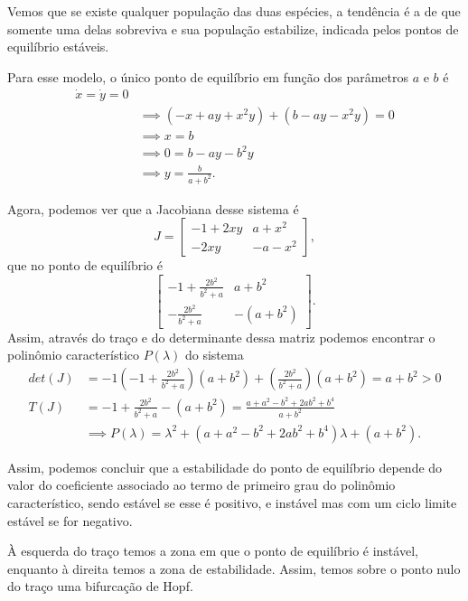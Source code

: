 \documentclass[a4paper]{report}
\begin{document}

Vemos que se existe qualquer população das duas espécies, a tendência é a de que somente uma delas sobreviva e sua população estabilize, indicada pelos pontos de equilíbrio estáveis.



Para esse modelo, o único ponto de equilíbrio em função dos parâmetros $a$ e $b$ é
\begin{align*}
    \dot{x} = \dot{y} = 0 \\
    &\implies\left( -x + ay +x^2y \right) + \left( b-ay-x^2y \right) =0 \\
    &\implies x = b \\
    &\implies 0=b-ay-b^2y \\
    &\implies y = \frac{b}{a+b^2}
.\end{align*}

Agora, podemos ver que a Jacobiana desse sistema é \[
J = \begin{bmatrix} 
    -1 +2xy & a+x^2 \\
    -2xy & -a -x^2
\end{bmatrix} 
,\] que no ponto de equilíbrio é \[
\begin{bmatrix} 
    -1 +\frac{2b^2}{b^2+ a} & a+b^2 \\
    -\frac{2b^2}{b^2 + a} & -(a +b^2)
\end{bmatrix} 
.\] Assim, através do traço e do determinante dessa matriz podemos encontrar o polinômio característico $P\left( \lambda \right)$ do sistema
\begin{align*}
    det(J) &= -1 \left( -1 + \frac{2b^2}{b^2+a} \right) \left(a+b^2  \right) + \left(    \frac{2b^2}{b^2+a}\right) \left( a+b^2 \right) = a+b^2 > 0\\
    T(J) &= -1 + \frac{2b^2}{b^2+a} -\left( a+b^2 \right) = \frac{a + a^2 - b^2 +2ab^2 + b^{4}}{a+b^2}\\
	 &\implies P\left( \lambda \right) = \lambda^2 + \left( a + a^2 - b^2 +2ab^2 + b^{4} \right) \lambda + \left( a+b^2 \right)
.\end{align*}

Assim, podemos concluir que a estabilidade do ponto de equilíbrio depende do valor do coeficiente associado ao termo de primeiro grau do polinômio característico, sendo estável se esse é positivo, e instável mas com um ciclo limite estável se for negativo.


À esquerda do traço temos a zona em que o ponto de equilíbrio é instável, enquanto à direita temos a zona de estabilidade. Assim, temos sobre o ponto nulo do traço uma bifurcação de Hopf.
\end{document}
